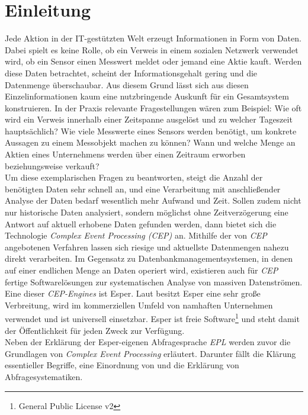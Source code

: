 \documentclass{acm_proc_article-sp}
\begin{document}
\section{Einleitung}
\vspace{0.1cm}
Jede Aktion in der IT-gestützten Welt erzeugt 
Informationen in Form von Daten. Dabei spielt es keine Rolle, ob ein Verweis in einem 
sozialen Netzwerk verwendet wird, ob ein Sensor einen Messwert meldet oder jemand eine 
Aktie kauft. Werden diese Daten betrachtet, scheint der Informationsgehalt gering und die 
Datenmenge überschaubar. Aus diesem Grund lässt sich aus diesen Einzelinformationen kaum 
eine nutzbringende Auskunft für ein Gesamtsystem konstruieren. In der Praxis relevante
Fragestellungen wären zum Beispiel: Wie oft wird ein Verweis innerhalb einer Zeitspanne 
ausgelöst und zu welcher Tageszeit hauptsächlich? Wie viele Messwerte eines Sensors 
werden benötigt, um konkrete Aussagen zu einem Messobjekt machen zu können? Wann und 
welche Menge an Aktien eines Unternehmens werden über einen Zeitraum erworben 
beziehungsweise verkauft?\\
Um diese exemplarischen Fragen zu beantworten, steigt die Anzahl der benötigten Daten 
sehr schnell an, und eine Verarbeitung mit anschließender Analyse der Daten bedarf 
wesentlich mehr Aufwand und Zeit.
Sollen zudem nicht nur historische Daten analysiert, sondern 
möglichst ohne Zeitverzögerung eine Antwort auf aktuell erhobene Daten gefunden werden, 
dann 
bietet sich die Technologie \textit{Complex Event Processing (CEP)} an. Mithilfe der von 
\textit{CEP} angebotenen Verfahren lassen sich riesige und aktuellste Datenmengen nahezu 
direkt verarbeiten. Im Gegensatz zu Datenbankmanagementsystemen, in denen auf einer 
endlichen Menge an Daten operiert wird, existieren auch für \textit{CEP} fertige 
Softwarelösungen zur systematischen Analyse von massiven Datenströmen. Eine dieser 
\textit{CEP-Engines} ist Esper. Laut \cite{fraunhofer} besitzt Esper eine 
sehr große Verbreitung, wird im kommerziellen Umfeld von namhaften Unternehmen 
verwendet und ist universell einsetzbar. Esper ist 
freie Software\footnote{General Public License v2} und steht damit der Öffentlichkeit für 
jeden Zweck zur Verfügung.\\
Neben der Erklärung der Esper-eigenen Abfragesprache \textit{EPL} werden zuvor die 
Grundlagen von \textit{Complex Event Processing} erläutert. Darunter fällt die Klärung 
essentieller Begriffe, eine Einordnung von  und die Erklärung von 
Abfragesystematiken.
\end{document}
